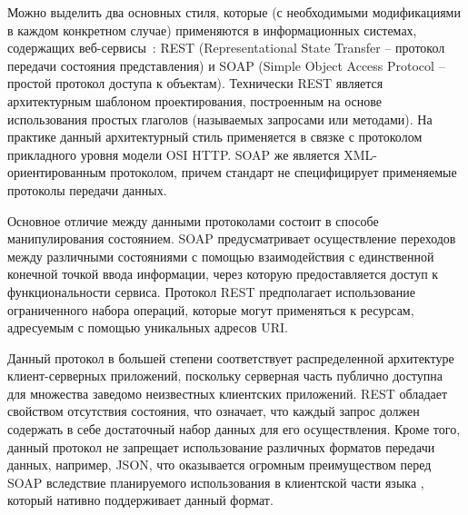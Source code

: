 Можно выделить два основных стиля, которые (с необходимыми модификациями в каждом конкретном случае) применяются в информационных системах, содержащих веб-сервисы~\cite{applicationArchitectureGuide}: REST (Representational State Transfer -- протокол передачи состояния представления) и SOAP (Simple Object Access Protocol -- простой протокол доступа к объектам). Технически REST является архитектурным шаблоном проектирования, построенным на основе использования простых глаголов (называемых запросами или методами). На практике данный архитектурный стиль применяется в связке с протоколом прикладного уровня модели OSI HTTP. SOAP же является XML-ориентированным протоколом, причем стандарт не специфицирует применяемые протоколы передачи данных.

Основное отличие между данными протоколами состоит в способе манипулирования состоянием. SOAP предусматривает осуществление переходов между различными состояниями с помощью взаимодействия с единственной конечной точкой ввода информации, через которую предоставляется доступ к функциональности сервиса. Протокол REST предполагает использование ограниченного набора операций, которые могут применяться к ресурсам, адресуемым с помощью уникальных адресов URI. 

Данный протокол в большей степени соответствует распределенной архитектуре клиент-серверных приложений, поскольку серверная часть публично доступна для множества заведомо неизвестных клиентских приложений. REST обладает свойством отсутствия состояния, что означает, что каждый запрос должен содержать в себе достаточный набор данных для его осуществления. Кроме того, данный протокол не запрещает использование различных форматов передачи данных, например, JSON, что оказывается огромным преимуществом перед SOAP вследствие планируемого использования в клиентской части языка \typescript, который нативно поддерживает данный формат.
